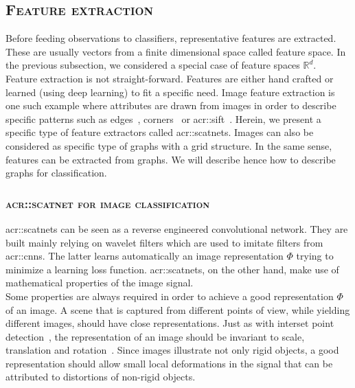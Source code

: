    \subsection{\textsc{Feature extraction}}
        \label{subsec::state_of_the_art::mlpr::feature_extraction}
            Before feeding observations to classifiers, representative features are extracted.
            These are usually vectors from a finite dimensional space called feature space.
            In the previous subsection, we considered a special case of feature spaces $\mathbb{R}^d$.\\

            Feature extraction is not straight-forward.
            Features are either hand crafted or learned (using deep learning) to fit a specific need.
            Image feature extraction is one such example where attributes are drawn from images in order to describe specific patterns such as edges~\parencite{canny1986computational}, corners~\parencite{harris1988combined} or \gls{acr::sift}~\parencite{lowe2004distinctive}.
            Herein, we present a specific type of feature extractors called \glspl{acr::scatnet}.
            Images can also be considered as specific type of graphs with a grid structure.
            In the same sense, features can be extracted from graphs.
            We will describe hence how to describe graphs for classification.

        \subsubsection{\textsc{\acrlong*{acr::scatnet} for image classification}}
            \label{subsubsec::state_of_the_art::mlpr::feature_extraction::scatnet}
            \glspl{acr::scatnet} can be seen as a reverse engineered convolutional network.
            They are built mainly relying on wavelet filters which are used to imitate filters from \glspl{acr::cnn}.
            The latter learns automatically an image representation $\Phi$ trying to minimize a learning loss function.
            \Glspl{acr::scatnet}, on the other hand, make use of mathematical properties of the image signal.\\

            Some properties are always required in order to achieve a good representation $\Phi$ of an image. 
            A scene that is captured from different points of view, while yielding different images, should have close representations.
            Just as with interset point detection~\parencite{lowe2004distinctive}, the representation of an image should be invariant to scale, translation and rotation~\parencite{mallat2012group,sifre2013rotation,bruna2013invariant}.
            Since images illustrate not only rigid objects, a good representation should allow small local deformations in the signal that can be attributed to distortions of non-rigid objects.\\

